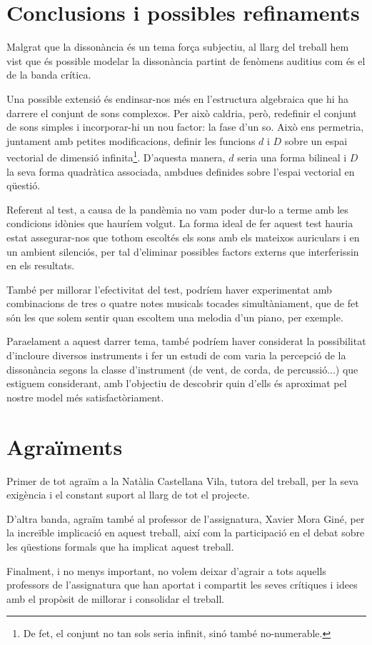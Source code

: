 \documentclass{article}
\theoremstyle{math}
\theoremstyle{TheoremNum}
\newcommand{\0}{\ensuremath{\vb{0}}}
\begin{document}
\section{Conclusions i possibles refinaments}
Malgrat que la dissonància és un tema força subjectiu, al llarg del treball hem vist que és possible modelar la dissonància partint de fenòmens auditius com és el de la banda crítica.\par
Una possible extensió és endinsar-nos més en l'estructura algebraica que hi ha darrere el conjunt de sons complexos. Per això caldria, però, redefinir el conjunt de sons simples i incorporar-hi un nou factor: la fase d'un so. Això ens permetria, juntament amb petites modificacions, definir les funcions $d$ i $D$ sobre un espai vectorial de dimensió infinita\footnote{De fet, el conjunt no tan sols seria infinit, sinó també no-numerable.}. D'aquesta manera, $d$ seria una forma bilineal i $D$ la seva forma quadràtica associada, ambdues definides sobre l'espai vectorial en qüestió.\par
Referent al test, a causa de la pandèmia no vam poder dur-lo a terme amb les condicions idònies que hauríem volgut. La forma ideal de fer aquest test hauria estat assegurar-nos que tothom escoltés els sons amb els mateixos auriculars i en un ambient silenciós, per tal d'eliminar possibles factors externs que interferissin en els resultats.\par
També per millorar l'efectivitat del test, podríem haver experimentat amb combinacions de tres o quatre notes musicals tocades simultàniament, que de fet són les que solem sentir quan escoltem una melodia d'un piano, per exemple. \par Para\lgem elament a aquest darrer tema, també podríem haver considerat la possibilitat d'incloure diversos instruments i fer un estudi de com varia la percepció de la dissonància segons la classe d'instrument (de vent, de corda, de percussió...) que estiguem considerant, amb l'objectiu de descobrir quin d'ells és aproximat pel nostre model més satisfactòriament.
\section{Agraïments}
Primer de tot agraïm a la Natàlia Castellana Vila, tutora del treball, per la seva exigència i el constant suport al llarg de tot el projecte. \par
D'altra banda, agraïm també al professor de l'assignatura, Xavier Mora Giné, per la increïble implicació en aquest treball, així com la participació en el debat sobre les qüestions formals que ha implicat aquest treball.\par 
Finalment, i no menys important, no volem deixar d'agrair a tots aquells professors de l'assignatura que han aportat i compartit les seves crítiques i idees amb el propòsit de millorar i consolidar el treball.
\printbibliography[heading=bibintoc]
\appendix
\end{document}
